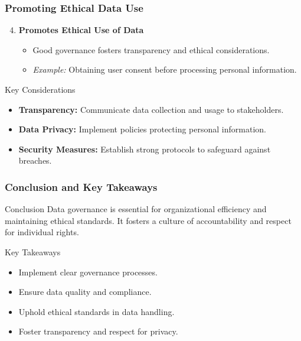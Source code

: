 \documentclass[aspectratio=169]{beamer}
\begin{document}
\begin{frame}[fragile]
    \frametitle{Promoting Ethical Data Use}
    \begin{enumerate}
        \setcounter{enumi}{3}
        \item \textbf{Promotes Ethical Use of Data}
        \begin{itemize}
            \item Good governance fosters transparency and ethical considerations.
            \item \textit{Example:} Obtaining user consent before processing personal information.
        \end{itemize}
    \end{enumerate}

    \begin{block}{Key Considerations}
        \begin{itemize}
            \item \textbf{Transparency:} Communicate data collection and usage to stakeholders.
            \item \textbf{Data Privacy:} Implement policies protecting personal information.
            \item \textbf{Security Measures:} Establish strong protocols to safeguard against breaches.
        \end{itemize}
    \end{block}
\end{frame}

\begin{frame}[fragile]
    \frametitle{Conclusion and Key Takeaways}
    \begin{block}{Conclusion}
        Data governance is essential for organizational efficiency and maintaining ethical standards. It fosters a culture of accountability and respect for individual rights.
    \end{block}

    \begin{block}{Key Takeaways}
        \begin{itemize}
            \item Implement clear governance processes.
            \item Ensure data quality and compliance.
            \item Uphold ethical standards in data handling.
            \item Foster transparency and respect for privacy.
        \end{itemize}
    \end{block}
\end{frame}
\end{document}
